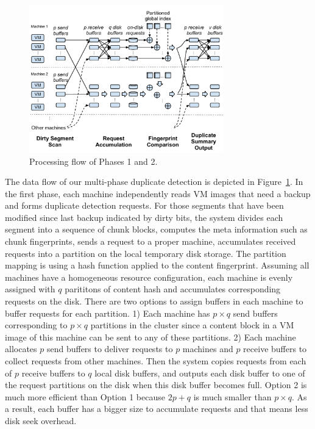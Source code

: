 \begin{figure}[tbhp]
\centering
\includegraphics[width=0.75\textwidth]{steps.pdf}
\caption{Processing flow of Phases 1  and 2.}
\label{fig:flow}
\end{figure}

The data flow of our multi-phase duplicate detection is depicted in Figure~\ref{fig:flow}. 
In the first phase, each machine independently reads  
VM images that need a backup
and forms duplicate  detection requests. For those segments that have been modified since last backup indicated by 
dirty bits,  the system divides  each segment into a sequence of chunk blocks,  computes the meta 
information such as chunk fingerprints,  sends a request to a proper machine, accumulates  
received requests into a partition on the local temporary disk storage. 
The partition mapping is using a hash function applied to the content fingerprint. 
Assuming all machines have a  homogeneous resource configuration, each machine is evenly  assigned with
$q$ parititons of content hash and accumulates corresponding requests on the disk. 
There are two options to assign buffers in each machine to buffer requests for each partition.
1) Each machine has  $p\times q$ send buffers corresponding to $p\times q$ partitions in the cluster
since a content block in a VM image of this machine can be sent to any of these partitions.
2) Each machine allocates $p$ send buffers to deliver requests to $p$ machines and 
$p$ receive buffers to collect requests  from other machines.
Then the system copies requests from each of $p$ receive buffers to  $q$ local disk buffers,
and outputs each disk buffer to one of the request partitions on the disk
when this disk buffer becomes full.  Option 2 is much more efficient than Option 1 because $2p+q$ is much smaller than
$p\times q$. As a result, each buffer has a bigger size to accumulate requests and that means
less disk seek overhead.

